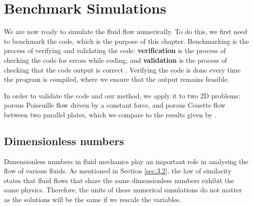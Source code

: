 \documentclass[a4paper, 11pt]{report}
\begin{document}
% 



\chapter{Benchmark Simulations} \label{chap:4}
We are now ready to simulate the fluid flow numerically. To do this, we first need to benchmark the code, which is the purpose of this chapter. Benchmarking is the process of verifying and validating the code: \textbf{verification} is the process of checking the code for errors while coding, and \textbf{validation} is the process of checking that the code output is correct \cite{v&v}. Verifying the code is done every time the program is compiled, where we ensure that the output remains feasible.


In order to validate the code and our method, we apply it to two 2D problems: porous Poiseuille flow driven by a constant force, and porous Couette flow between two parallel plates, which we compare to the results given by \cite{guo+zhao}. %

\section{Dimensionless numbers}
Dimensionless numbers in fluid mechanics play an important role in analysing the flow of various fluids. As mentioned in Section \ref{sec:3.2}, the law of similarity states that fluid flows that share the same dimensionless numbers exhibit the same physics. Therefore, the units of these numerical simulations do not matter as the solutions will be the same if we rescale the variables.
\end{document}
